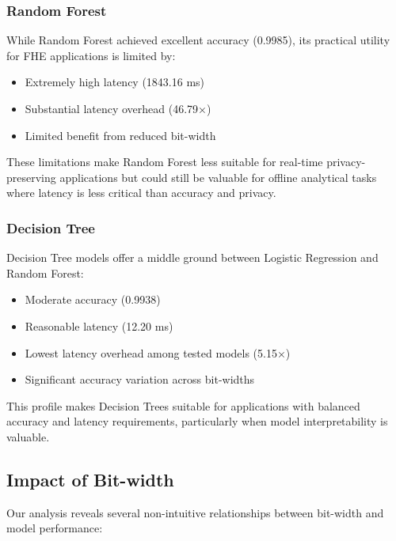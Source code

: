\documentclass[a4paper,12pt]{article}
\begin{document}
\subsubsection{Random Forest}
While Random Forest achieved excellent accuracy (0.9985), its practical utility for FHE applications is limited by:
\begin{itemize}
    \item Extremely high latency (1843.16 ms)
    \item Substantial latency overhead (46.79×)
    \item Limited benefit from reduced bit-width
\end{itemize}

These limitations make Random Forest less suitable for real-time privacy-preserving applications but could still be valuable for offline analytical tasks where latency is less critical than accuracy and privacy.

\subsubsection{Decision Tree}
Decision Tree models offer a middle ground between Logistic Regression and Random Forest:
\begin{itemize}
    \item Moderate accuracy (0.9938)
    \item Reasonable latency (12.20 ms)
    \item Lowest latency overhead among tested models (5.15×)
    \item Significant accuracy variation across bit-widths
\end{itemize}

This profile makes Decision Trees suitable for applications with balanced accuracy and latency requirements, particularly when model interpretability is valuable.

\subsection{Impact of Bit-width}
Our analysis reveals several non-intuitive relationships between bit-width and model performance:
\end{document}
